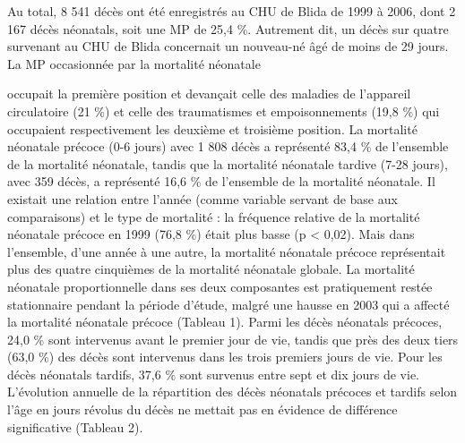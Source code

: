 \documentclass[
]{book}
\begin{document}
Au total, 8 541 décès ont été enregistrés au CHU de Blida de 1999 à 2006, dont 2 167 décès néonatals, soit une MP de 25,4 \%. Autrement dit, un décès sur quatre survenant au CHU de Blida concernait un nouveau-né âgé de moins de 29 jours. La MP occasionnée par la mortalité néonatale

occupait la première position et devançait celle des maladies de l'appareil circulatoire (21 \%) et celle des traumatismes et empoisonnements (19,8 \%) qui occupaient respectivement les deuxième et troisième position. La mortalité néonatale précoce (0-6 jours) avec 1 808 décès a représenté 83,4 \% de l'ensemble de la mortalité néonatale, tandis que la mortalité néonatale tardive (7-28 jours), avec 359 décès, a représenté 16,6 \% de l'ensemble de la mortalité néonatale. Il existait une relation entre l'année (comme variable servant de base aux comparaisons) et le type de mortalité : la fréquence relative de la mortalité néonatale précoce en 1999 (76,8 \%) était plus basse (p \textless{} 0,02). Mais dans l'ensemble, d'une année à une autre, la mortalité néonatale précoce représentait plus des quatre cinquièmes de la mortalité néonatale globale. La mortalité néonatale proportionnelle dans ses deux composantes est pratiquement restée stationnaire pendant la période d'étude, malgré une hausse en 2003 qui a affecté la mortalité néonatale précoce (Tableau 1). Parmi les décès néonatals précoces, 24,0 \% sont intervenus avant le premier jour de vie, tandis que près des deux tiers (63,0 \%) des décès sont intervenus dans les trois premiers jours de vie. Pour les décès néonatals tardifs, 37,6 \% sont survenus entre sept et dix jours de vie. L'évolution annuelle de la répartition des décès néonatals précoces et tardifs selon l'âge en jours révolus du décès ne mettait pas en évidence de différence significative (Tableau 2).
\end{document}

